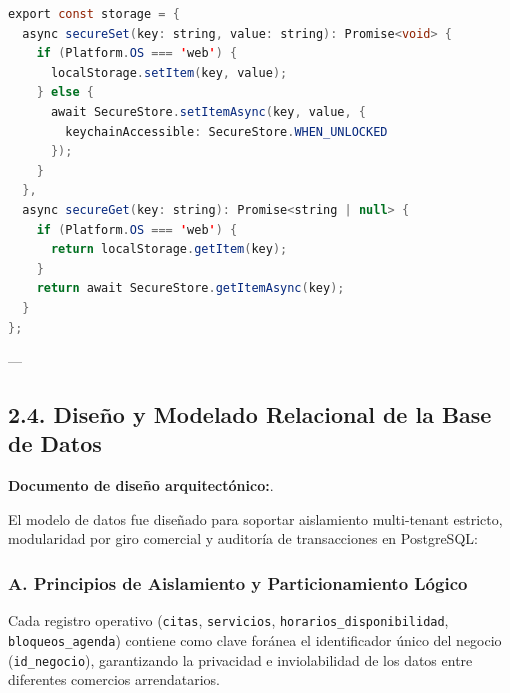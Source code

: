\documentclass[11pt,letterpaper]{article}
\begin{document}
\begin{lstlisting}[language=Java, caption={Adaptador de persistencia segura con cifrado en hardware nativo}]
export const storage = {
  async secureSet(key: string, value: string): Promise<void> {
    if (Platform.OS === 'web') {
      localStorage.setItem(key, value);
    } else {
      await SecureStore.setItemAsync(key, value, {
        keychainAccessible: SecureStore.WHEN_UNLOCKED
      });
    }
  },
  async secureGet(key: string): Promise<string | null> {
    if (Platform.OS === 'web') {
      return localStorage.getItem(key);
    }
    return await SecureStore.getItemAsync(key);
  }
};
\end{lstlisting}

---

\subsection{2.4. Diseño y Modelado Relacional de la Base de Datos}
\textbf{Documento de diseño arquitectónico:}.

El modelo de datos fue diseñado para soportar aislamiento multi-tenant estricto, modularidad por giro comercial y auditoría de transacciones en PostgreSQL:

\subsubsection{A. Principios de Aislamiento y Particionamiento Lógico}
Cada registro operativo (\texttt{citas}, \texttt{servicios}, \texttt{horarios\_disponibilidad}, \texttt{bloqueos\_agenda}) contiene como clave foránea el identificador único del negocio (\texttt{id\_negocio}), garantizando la privacidad e inviolabilidad de los datos entre diferentes comercios arrendatarios.
\end{document}
